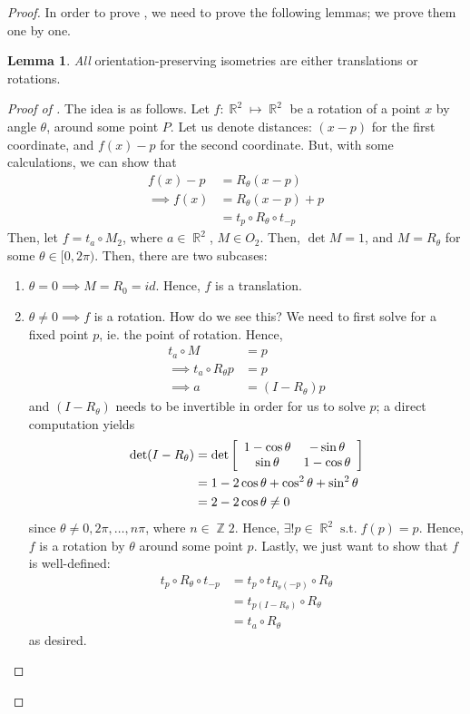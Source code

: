 \documentclass[11pt]{amsart} %
\theoremstyle{definition}
\newtheorem{lemma}[definition]{Lemma}
\theoremstyle{definition}
\DeclareMathOperator{\R}{\mathbb{R}}
\DeclareMathOperator{\Z}{\mathbb{Z}}
\DeclareMathOperator{\suchthat}{\text{ s.t. }}
\numberwithin{equation}{section}
\begin{document}
\begin{proof}
	In order to prove , we need to prove the following lemmas; we prove them one by one.
	
	\begin{lemma}
		\label{lemmaoptransrot}
		\textit{All} orientation-preserving isometries are either translations or rotations. 
	\end{lemma}

	\begin{proof}[Proof of ]
		The idea is as follows. Let $f: \R^2 \mapsto \R^2$ be a rotation of a point $x$ by angle $\theta$, around some point $P$. Let us denote distances: $(x-p)$ for the first coordinate, and $f(x)-p$ for the second coordinate. But, with some calculations, we can show that
		\begin{align*}
		f(x) - p &= R_{\theta} (x-p) \\
		\implies f(x)&= R_{\theta} (x-p) + p \\
		&= t_p \circ R_{\theta} \circ t_{-p} 
		\end{align*}
		Then, let $f = t_a \circ M_2$, where $a \in \R^2$, $M \in O_2$. Then, $\det M =1$, and $M = R_{\theta}$ for some $\theta \in [0,2\pi)$. Then, there are two subcases:
		\begin{enumerate}%
			\item $\theta =0 \implies M=R_0 = id$. Hence, $f$ is a translation.
			\item $\theta \neq 0 \implies f$ is a rotation. How do we see this? We need to first solve for a fixed point $p$, ie. the point of rotation. Hence,
			\begin{align*}
			t_a \circ M &= p \\
			\implies t_a \circ R_{\theta} p &= p \\
			\implies a &= (I - R_{\theta}) p
			\end{align*}
			and $(I- R_\theta)$ needs to be invertible in order for us to solve $p$; a direct computation yields
			\begin{align*}
			\det (I- R_\theta)&= \det \left[ \begin{array}{c c} 1 - \cos \theta & -\sin \theta \\ \sin \theta & 1 - \cos \theta \end{array} \right] \\
			&= 1 - 2\cos \theta + \cos^2 \theta + \sin^2 \theta \\
			&= 2 - 2 \cos \theta \neq 0
			\end{align*}
			since $\theta \neq 0, 2\pi, \dots, n\pi$, where $n \in \Z 2$. Hence, $\exists! p \in \R^2 \suchthat f(p)=p$. Hence, $f$ is a rotation by $\theta$ around some point $p$. Lastly, we just want to show that $f$ is well-defined:
			\begin{align*}
			t_p \circ R_{\theta} \circ t_{-p} &=t_p \circ t_{R_\theta (-p)} \circ R_\theta \\
			&=  t_{ p (I - R_\theta) } \circ R_\theta \\
			&=   t_{ a} \circ R_\theta 			
			\end{align*}
			as desired.
		\end{enumerate}
	\end{proof}
	

\end{proof}
\end{document}
